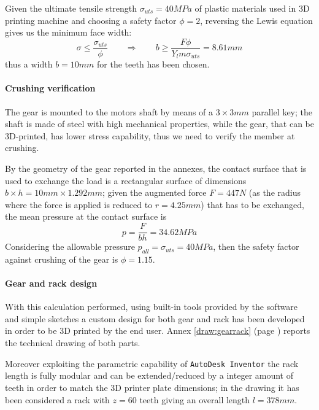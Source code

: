 	Given the ultimate tensile strength $\sigma_{uts} = 40MPa$ of plastic materials used in 3D printing machine and choosing a safety factor $\phi= 2$, reversing the Lewis equation gives us the minimum face width:
	\[ \sigma \leq \frac{\sigma_{uts}}{\phi} \qquad \Rightarrow \qquad b \geq \frac{F \phi}{Y_l m \sigma_{uts}} = 8.61mm \]
	thus a width $b = 10mm$ for the teeth has been chosen.
	
	\paragraph{Crushing verification} The gear is mounted to the motors shaft by means of a $3\times 3mm$ parallel key; the shaft is made of steel with high mechanical properties, while the gear, that can be 3D-printed, has lower stress capability, thus we need to verify the member at crushing.
	
	By the geometry of the gear reported in the annexes, the contact surface that is used to exchange the load is a rectangular surface of dimensions $b\times h = 10 mm \times 1.292mm$; given the augmented force $F = 447N$ (as the radius where the force is applied is reduced to $r = 4.25mm$) that has to be exchanged, the mean pressure at the contact surface is
	\[ p = \frac{F}{bh} = 34.62MPa \]
	Considering the allowable pressure $p_{all} = \sigma_{uts} = 40MPa$, then the safety factor against crushing of the gear is $\phi = 1.15$.
	
	\paragraph{Gear and rack design} With this calculation performed, using built-in tools provided by the software and simple sketches a custom design for both gear and rack has been developed in order to be 3D printed by the end user. Annex \ref{draw:gearrack} (page \pageref{draw:gearrack}) reports the technical drawing of both parts.
	
	Moreover exploiting the parametric capability of \texttt{AutoDesk Inventor} the rack length is fully modular and can be extended/reduced by a integer amount of teeth in order to match the 3D printer plate dimensions; in the drawing it has been considered a rack with $z = 60$ teeth giving an overall length $l = 378mm$. 
	
	
	